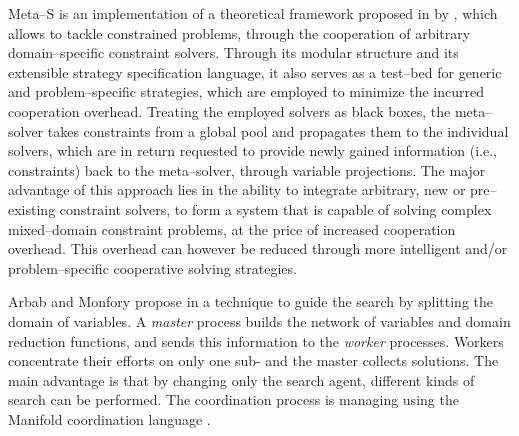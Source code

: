 {\sc Meta--S} is an implementation of a theoretical framework proposed in \cite{Frank2003} by , which allows to tackle constrained problems, through the cooperation of arbitrary domain--specific constraint solvers. Through its modular structure and its extensible strategy specification language, it also serves as a test--bed for generic and problem--specific  strategies, which are employed to minimize the incurred cooperation overhead. Treating the employed solvers as black boxes, the meta--solver takes constraints from a global pool and propagates them to the individual solvers, which are in return requested to provide newly gained information (i.e., constraints) back to the meta--solver, through variable projections. The major advantage of this approach lies in the ability to integrate arbitrary, new or pre--existing constraint solvers, to form a system that is capable of solving complex mixed--domain constraint problems, at the price of increased cooperation overhead. This overhead can however be reduced through more intelligent and/or problem--specific cooperative solving strategies. 



Arbab and Monfory propose in \cite{Arbab2000} a technique to guide the search by splitting the domain of variables. A \textit{master} process builds the network of variables and domain reduction functions, and sends this information to the \textit{worker} processes. Workers concentrate their efforts on only one sub-\csp{} and the master collects solutions. The main advantage is that by changing only the search agent, different kinds of search can be performed. The coordination process is managing using the {\sc Manifold} coordination language \cite{Arbab1995}.

